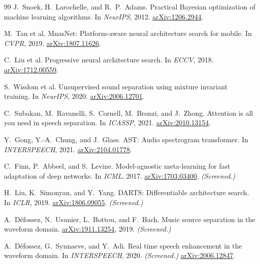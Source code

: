 \documentclass[10pt,twocolumn,letterpaper]{article}
\theoremstyle{remark}
\begin{document}
{\begin{thebibliography}{99}
J.~Snoek, H.~Larochelle, and R.~P.~Adams.
\newblock Practical Bayesian optimization of machine learning algorithms.
\newblock In \emph{NeurIPS}, 2012.
\newblock \href{https://arxiv.org/abs/1206.2944}{arXiv:1206.2944}.

M.~Tan et al.
\newblock MnasNet: Platform-aware neural architecture search for mobile.
\newblock In \emph{CVPR}, 2019.
\newblock \href{https://arxiv.org/abs/1807.11626}{arXiv:1807.11626}.

C.~Liu et al.
\newblock Progressive neural architecture search.
\newblock In \emph{ECCV}, 2018.
\newblock \href{https://arxiv.org/abs/1712.00559}{arXiv:1712.00559}.

S.~Wisdom et al.
\newblock Unsupervised sound separation using mixture invariant training.
\newblock In \emph{NeurIPS}, 2020.
\newblock \href{https://arxiv.org/abs/2006.12701}{arXiv:2006.12701}.

C.~Subakan, M.~Ravanelli, S.~Cornell, M.~Bronzi, and J.~Zhong.
\newblock Attention is all you need in speech separation.
\newblock In \emph{ICASSP}, 2021.
\newblock \href{https://arxiv.org/abs/2010.13154}{arXiv:2010.13154}.

Y.~Gong, Y.-A.~Chung, and J.~Glass.
\newblock AST: Audio spectrogram transformer.
\newblock In \emph{INTERSPEECH}, 2021.
\newblock \href{https://arxiv.org/abs/2104.01778}{arXiv:2104.01778}.

C.~Finn, P.~Abbeel, and S.~Levine.
\newblock Model-agnostic meta-learning for fast adaptation of deep networks.
\newblock In \emph{ICML}, 2017.
\newblock \href{https://arxiv.org/abs/1703.03400}{arXiv:1703.03400}. \textit{(Screened.)}

H.~Liu, K.~Simonyan, and Y.~Yang.
\newblock DARTS: Differentiable architecture search.
\newblock In \emph{ICLR}, 2019.
\newblock \href{https://arxiv.org/abs/1806.09055}{arXiv:1806.09055}. \textit{(Screened.)}

A.~D\'efossez, N.~Usunier, L.~Bottou, and F.~Bach.
\newblock Music source separation in the waveform domain.
\newblock \href{https://arxiv.org/abs/1911.13254}{arXiv:1911.13254}, 2019. \textit{(Screened.)}

A.~D\'efossez, G.~Synnaeve, and Y.~Adi.
\newblock Real time speech enhancement in the waveform domain.
\newblock In \emph{INTERSPEECH}, 2020. \textit{(Screened.)}
\newblock \href{https://arxiv.org/abs/2006.12847}{arXiv:2006.12847}.


\end{thebibliography}}
\end{document}
